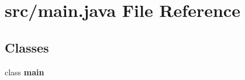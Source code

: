 \section{src/main.java File Reference}
\label{main_8java}
\subsection*{Classes}
\begin{DoxyCompactItemize}
\item 
class {\bf main}
\end{DoxyCompactItemize}
